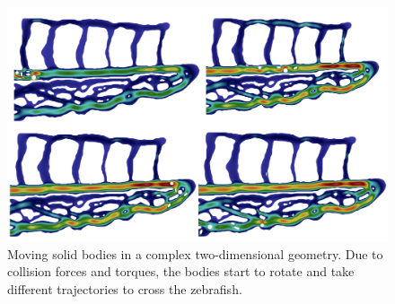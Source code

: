 \documentclass[graybox]{svmult}
\begin{document}

\begin{figure}
	\centering
	\includegraphics[width=0.85\linewidth]{Figures/zf/zf.png}

	\caption{Moving solid bodies in a complex two-dimensional geometry. Due to collision forces and torques, the bodies start to rotate and take different trajectories to cross the zebrafish.}
	\label{Fig:insertion2D}
\end{figure}


\end{document}
